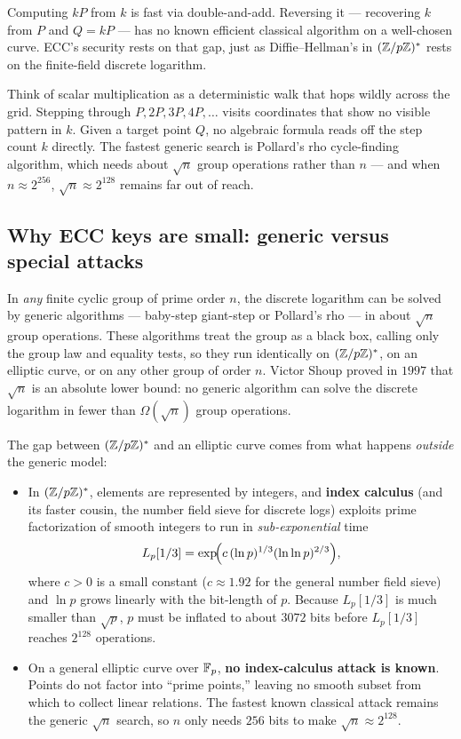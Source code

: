 Computing $kP$ from $k$ is fast via double-and-add. Reversing it --- recovering $k$ from
$P$ and $Q = kP$ --- has no known efficient classical algorithm on a well-chosen curve.
ECC's security rests on that gap, just as Diffie--Hellman's in $(\mathbb{Z}/p\mathbb{Z})^{*}$ rests on the
finite-field discrete logarithm.

\begin{intuitionbox}
Think of scalar multiplication as a deterministic walk that hops wildly across the grid.
Stepping through $P, 2P, 3P, 4P, \dots$ visits coordinates that show no visible pattern
in $k$. Given a target point $Q$, no algebraic formula reads off the step count $k$
directly. The fastest generic search is Pollard's rho cycle-finding algorithm, which
needs about $\sqrt{n}$ group operations rather than $n$ --- and when $n \approx 2^{256}$,
$\sqrt{n} \approx 2^{128}$ remains far out of reach.
\end{intuitionbox}

\subsection{Why ECC keys are small: generic versus special attacks}
\label{ch21:keysize}

In \emph{any} finite cyclic group of prime order $n$, the discrete logarithm can be solved
by generic algorithms --- baby-step giant-step or Pollard's rho --- in about $\sqrt{n}$
group operations. These algorithms treat the group as a black box, calling only the group
law and equality tests, so they run identically on $(\mathbb{Z}/p\mathbb{Z})^{*}$, on an elliptic curve, or on
any other group of order $n$. Victor Shoup proved in $1997$ that $\sqrt{n}$ is an absolute
lower bound: no generic algorithm can solve the discrete logarithm in fewer than
$\Omega(\sqrt{n})$ group operations.

The gap between $(\mathbb{Z}/p\mathbb{Z})^{*}$ and an elliptic curve comes from what happens \emph{outside} the
generic model:

\begin{itemize}
  \item In $(\mathbb{Z}/p\mathbb{Z})^{*}$, elements are represented by integers, and \textbf{index calculus}
        (and its faster cousin, the number field sieve for discrete logs) exploits prime
        factorization of smooth integers to run in \emph{sub-exponential} time
        \[
        L_p[1/3] = \exp\!\Bigl(c\,(\ln p)^{1/3}(\ln\ln p)^{2/3}\Bigr),
        \]
        where $c > 0$ is a small constant ($c \approx 1.92$ for the general number field
        sieve) and $\ln p$ grows linearly with the bit-length of $p$. Because $L_p[1/3]$
        is much smaller than $\sqrt{p}$, $p$ must be inflated to about $3072$ bits before
        $L_p[1/3]$ reaches $2^{128}$ operations.
  \item On a general elliptic curve over $\mathbb{F}_p$, \textbf{no index-calculus attack is
        known}. Points do not factor into ``prime points,'' leaving no smooth subset from
        which to collect linear relations. The fastest known classical attack remains the
        generic $\sqrt{n}$ search, so $n$ only needs $256$ bits to make $\sqrt{n} \approx
        2^{128}$.
\end{itemize}

